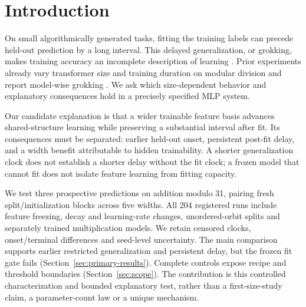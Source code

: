 \section{Introduction}
\label{sec:introduction}
On small algorithmically generated tasks, fitting the training labels can precede held-out prediction by a long interval. This delayed generalization, or grokking, makes training accuracy an incomplete description of learning \citep{power2022grokking}. Prior experiments already vary transformer size and training duration on modular division and report model-wise grokking \citep{davies2023unifying}. We ask which size-dependent behavior and explanatory consequences hold in a precisely specified MLP system.

Our candidate explanation is that a wider trainable feature basis advances shared-structure learning while preserving a substantial interval after fit. Its consequences must be separated: earlier held-out onset, persistent post-fit delay, and a width benefit attributable to hidden trainability. A shorter generalization clock does not establish a shorter delay without the fit clock; a frozen model that cannot fit does not isolate feature learning from fitting capacity.

We test three prospective predictions on addition modulo 31, pairing fresh split/initialization blocks across five widths. All 204 registered runs include feature freezing, decay and learning-rate changes, unordered-orbit splits and separately trained multiplication models. We retain censored clocks, onset/terminal differences and seed-level uncertainty. The main comparison supports earlier restricted generalization and persistent delay, but the frozen fit gate fails (Section~\ref{sec:primary-results}). Complete controls expose recipe and threshold boundaries (Section~\ref{sec:scope}). The contribution is this controlled characterization and bounded explanatory test, rather than a first-size-study claim, a parameter-count law or a unique mechanism.
